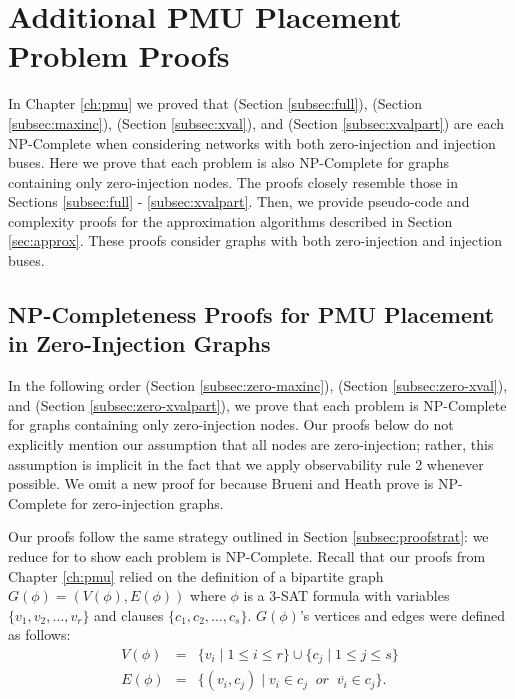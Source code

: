 \chapter{Additional PMU Placement Problem Proofs}
\label{ch:appendix-pmu}


In Chapter \ref{ch:pmu} we proved that \full (Section \ref{subsec:full}), \maxinc (Section \ref{subsec:maxinc}), \xval (Section \ref{subsec:xval}),
and \xvalpart (Section \ref{subsec:xvalpart}) are each NP-Complete when considering networks with both zero-injection and injection buses.  Here we prove that each problem is also NP-Complete
for graphs containing only zero-injection nodes.  The proofs closely resemble those in Sections \ref{subsec:full} - \ref{subsec:xvalpart}. %
Then, we provide pseudo-code and complexity proofs for the approximation algorithms described in Section \ref{sec:approx}.  These proofs consider graphs with both zero-injection and injection buses. 



\section{NP-Completeness Proofs for PMU Placement in Zero-Injection Graphs}

In the following order \maxinc (Section \ref{subsec:zero-maxinc}), \xval (Section \ref{subsec:zero-xval}), and \xvalpart (Section \ref{subsec:zero-xvalpart}), 
we prove that each problem is NP-Complete for graphs containing only zero-injection nodes.  Our proofs below do not explicitly mention our assumption that all nodes 
are zero-injection; rather, %
this assumption is implicit in the fact that we apply observability rule 2 whenever possible.
We omit a new proof for \full because Brueni and Heath \cite{Brueni05} prove \full is NP-Complete for zero-injection graphs.  

Our proofs follow the same strategy outlined in Section \ref{subsec:proofstrat}: we reduce for \sat to show each problem is NP-Complete.  
Recall that our proofs from Chapter \ref{ch:pmu} relied on the definition of a bipartite 
graph $G(\phi)=(V(\phi),E(\phi))$ where $\phi$ is a 3-SAT formula with variables $\{v_1,v_2, \dots , v_r\}$ and clauses $\{c_1,c_2, \dots , c_s \}$.  
$G(\phi)$'s vertices and edges were defined as follows:
\begin{eqnarray*}
 V(\phi) &= &\{v_i\; \vert\; 1 \leq i \leq r \} \cup \{c_j \;\vert\; 1 \leq j \leq s \} \\
 E(\phi) &=& \{ (v_i,c_j)\;\vert\; v_i \in c_j\;\; or \;\; \overline{v_i} \in c_j\}.
\end{eqnarray*}


